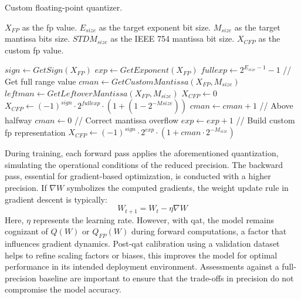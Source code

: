 \begin{algorithm}[h!]
	\caption{Custom floating-point quantizer.}
	\label{alg:quantizr}
	\begin{algorithmic}
		\SetAlgoLined
		\renewcommand{\algorithmicrequire}{\textbf{input:}}
		\renewcommand{\algorithmicensure}{\textbf{output:}}
		\REQUIRE $X_{FP}$ as the \gls{fp} value.
		\REQUIRE $E_{size}$ as the target exponent bit size.
		\REQUIRE $M_{size}$ as the target mantissa bits size.
		\REQUIRE $STDM_{size}$ as the IEEE 754 mantissa bit size.
		\ENSURE $X_{CFP}$ as the custom \gls{fp} value.
		
		\STATE $sign \gets GetSign(X_{FP})$
		\STATE $exp \gets GetExponent(X_{FP})$
		\STATE $fullexp \gets 2^{E_{size}-1}-1$ // Get full range value
		\STATE $cman \gets GetCustomMantissa(X_{FP}, M_{size})$
		\STATE $leftman \gets GetLeftoverMantissa(X_{FP}, M_{size})$
		\STATE$X_{CFP}\gets0$
		\STATE$X_{CFP}\gets (-1)^{sign}\cdot2^{fullexp}\cdot(1+(1-2^{-M{size}}))$
		\ELSE
		\STATE $cman \gets cman+1$ // Above halfway
		\STATE $cman \gets 0$ // Correct mantissa overflow
		\STATE $exp \gets exp + 1$
		\ENDIF
		\ENDIF
		\STATE // Build custom \gls{fp} representation
		\STATE$X_{CFP}\gets (-1)^{sign}\cdot2^{exp}\cdot(1+cman\cdot2^{-M_{size}})$
		\ENDIF
	\end{algorithmic}
\end{algorithm}

During training, each forward pass applies the aforementioned quantization, simulating the operational conditions of the reduced precision. The backward pass, essential for gradient-based optimization, is conducted with a higher precision. If \( \nabla W \) symbolizes the computed gradients, the weight update rule in gradient descent is typically:
\begin{equation}
W_{t+1} = W_t - \eta \nabla W
\end{equation}
Here, \( \eta \) represents the learning rate. However, with \gls{qat}, the model remains cognizant of \( Q(W) \) or \( Q_{FP}(W) \) during forward computations, a factor that influences gradient dynamics. Post-\gls{qat} calibration using a validation dataset helps to refine scaling factors or biases, this improves the model for optimal performance in its intended deployment environment. Assessments against a full-precision baseline are important to ensure that the trade-offs in precision do not compromise the model accuracy.

